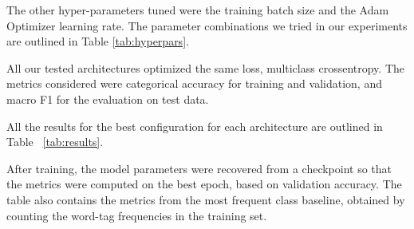\documentclass[11pt]{article}
\begin{document}
The other hyper-parameters tuned were the training batch size and the Adam Optimizer learning rate. 
The parameter combinations we tried in our experiments are outlined in Table \ref{tab:hyperpars}. %

All our tested architectures optimized the same loss, multiclass crossentropy.
The metrics considered were categorical accuracy for training and validation, and macro F1 for the evaluation on test data.


\begin{table}[htb]
\caption{Hyper-parameters combinations and best configuration for each model.}
\label{tab:hyperpars}

\end{table}

All the results for the best configuration for each architecture are outlined in Table ~\ref{tab:results}. 

After training, the model parameters were recovered from a checkpoint so that the metrics were computed on the best epoch, based on validation accuracy. The table also contains the metrics from the most frequent class baseline, obtained by counting the word-tag frequencies in the training set.

\begin{table}[htb]
\caption{Total number of training epochs and validation accuracy for each architecture, and macro F1 scores for the two best models (selected based on val. accuracy).}
\label{tab:results}

\end{table}
\end{document}

